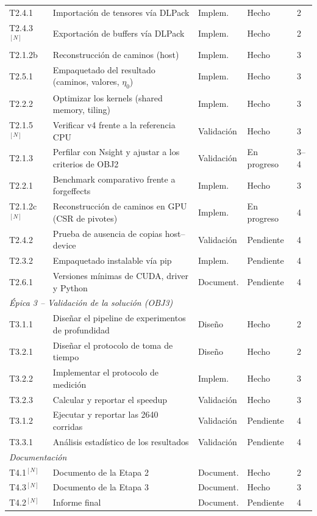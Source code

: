 \documentclass[11pt,a4paper]{article}
\newcommand{\Hecho}{\textcolor{hecho}{Hecho}}
\newcommand{\EnProg}{\textcolor{prog}{En progreso}}
\newcommand{\Pend}{\textcolor{pendc}{Pendiente}}
\newcommand{\N}{$^{[N]}$}
\begin{document}
{\begin{longtable}{p{1.45cm}p{7.3cm}p{1.6cm}p{1.75cm}p{0.9cm}}
T2.4.1 & Importación de tensores vía DLPack & Implem. & \Hecho & 2\\
T2.4.3\N & Exportación de buffers vía DLPack & Implem. & \Hecho & 2\\
T2.1.2b & Reconstrucción de caminos (host) & Implem. & \Hecho & 3\\
T2.5.1 & Empaquetado del resultado (caminos, valores, $\eta_0$) & Implem. & \Hecho & 3\\
T2.2.2 & Optimizar los kernels (shared memory, tiling) & Implem. & \Hecho & 3\\
T2.1.5\N & Verificar v4 frente a la referencia CPU & Validación & \Hecho & 3\\
T2.1.3 & Perfilar con Nsight y ajustar a los criterios de OBJ2 & Validación & \EnProg & 3--4\\
T2.2.1 & Benchmark comparativo frente a forgeffects & Implem. & \Hecho & 3\\
T2.1.2c\N & Reconstrucción de caminos en GPU (CSR de pivotes) & Implem. & \EnProg & 4\\
T2.4.2 & Prueba de ausencia de copias host--device & Validación & \Pend & 4\\
T2.3.2 & Empaquetado instalable vía pip & Implem. & \Pend & 4\\
T2.6.1 & Versiones mínimas de CUDA, driver y Python & Document. & \Pend & 4\\
\midrule
\multicolumn{5}{l}{\emph{Épica 3 -- Validación de la solución (OBJ3)}}\\
T3.1.1 & Diseñar el pipeline de experimentos de profundidad & Diseño & \Hecho & 2\\
T3.2.1 & Diseñar el protocolo de toma de tiempo & Diseño & \Hecho & 2\\
T3.2.2 & Implementar el protocolo de medición & Implem. & \Hecho & 3\\
T3.2.3 & Calcular y reportar el speedup & Validación & \Hecho & 3\\
T3.1.2 & Ejecutar y reportar las \num{2640} corridas & Validación & \Pend & 4\\
T3.3.1 & Análisis estadístico de los resultados & Validación & \Pend & 4\\
\midrule
\multicolumn{5}{l}{\emph{Documentación}}\\
T4.1\N & Documento de la Etapa 2 & Document. & \Hecho & 2\\
T4.3\N & Documento de la Etapa 3 & Document. & \Hecho & 3\\
T4.2\N & Informe final & Document. & \Pend & 4\\
\bottomrule
\end{longtable}
}
\end{document}
